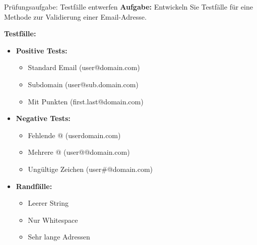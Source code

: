 \begin{example2}{Prüfungsaufgabe: Testfälle entwerfen}
\textbf{Aufgabe:}
Entwickeln Sie Testfälle für eine Methode zur Validierung einer Email-Adresse.

\textbf{Testfälle:}
\begin{itemize}
    \item \textbf{Positive Tests:}
    \begin{itemize}
        \item Standard Email (user@domain.com)
        \item Subdomain (user@sub.domain.com)
        \item Mit Punkten (first.last@domain.com)
    \end{itemize}
    
    \item \textbf{Negative Tests:}
    \begin{itemize}
        \item Fehlende @ (userdomain.com)
        \item Mehrere @ (user@@domain.com)
        \item Ungültige Zeichen (user\#@domain.com)
    \end{itemize}
    
    \item \textbf{Randfälle:}
    \begin{itemize}
        \item Leerer String
        \item Nur Whitespace
        \item Sehr lange Adressen
    \end{itemize}
\end{itemize}
\end{example2}